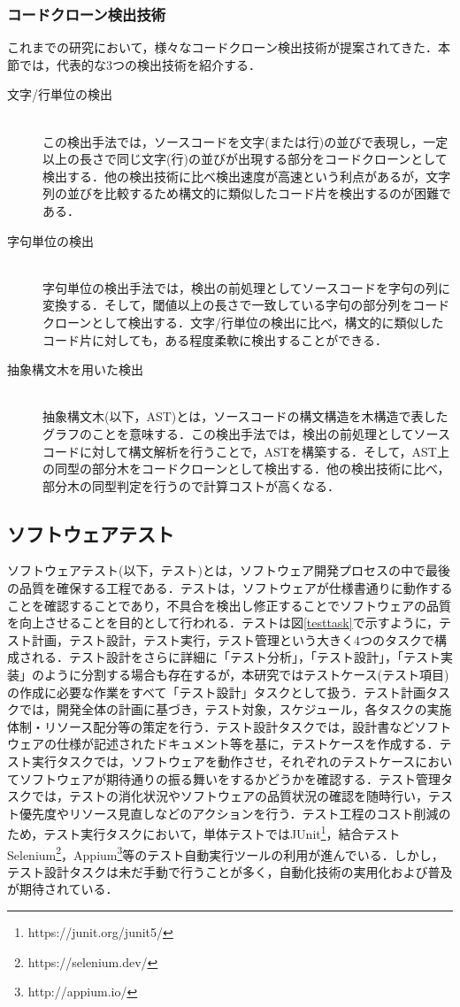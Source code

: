 \documentclass[12pt]{jarticle} %
\begin{document}
\subsubsection{コードクローン検出技術}
これまでの研究において，様々なコードクローン検出技術が提案されてきた\cite{c6,c1}．本節では，代表的な3つの検出技術を紹介する．

\begin{description}
\item[文字/行単位の検出]~\\
この検出手法では，ソースコードを文字(または行)の並びで表現し，一定以上の長さで同じ文字(行)の並びが出現する部分をコードクローンとして検出する．他の検出技術に比べ検出速度が高速という利点があるが，文字列の並びを比較するため構文的に類似したコード片を検出するのが困難である．
\item[字句単位の検出]~\\
字句単位の検出手法では，検出の前処理としてソースコードを字句の列に変換する．そして，閾値以上の長さで一致している字句の部分列をコードクローンとして検出する．文字/行単位の検出に比べ，構文的に類似したコード片に対しても，ある程度柔軟に検出することができる．
\item[抽象構文木を用いた検出]~\\
抽象構文木(以下，AST)とは，ソースコードの構文構造を木構造で表したグラフのことを意味する．この検出手法では，検出の前処理としてソースコードに対して構文解析を行うことで，ASTを構築する．そして，AST上の同型の部分木をコードクローンとして検出する．他の検出技術に比べ，部分木の同型判定を行うので計算コストが高くなる．
\end{description}

\subsection{ソフトウェアテスト}
ソフトウェアテスト(以下，テスト)とは，ソフトウェア開発プロセスの中で最後の品質を確保する工程である．テストは，ソフトウェアが仕様書通りに動作することを確認することであり，不具合を検出し修正することでソフトウェアの品質を向上させることを目的として行われる．テストは図\ref{testtask}で示すように，テスト計画，テスト設計，テスト実行，テスト管理という大きく4つのタスクで構成される．テスト設計をさらに詳細に「テスト分析」，「テスト設計」，「テスト実装」のように分割する場合も存在するが，本研究ではテストケース(テスト項目)の作成に必要な作業をすべて「テスト設計」タスクとして扱う．テスト計画タスクでは，開発全体の計画に基づき，テスト対象，スケジュール，各タスクの実施体制・リソース配分等の策定を行う．テスト設計タスクでは，設計書などソフトウェアの仕様が記述されたドキュメント等を基に，テストケースを作成する．テスト実行タスクでは，ソフトウェアを動作させ，それぞれのテストケースにおいてソフトウェアが期待通りの振る舞いをするかどうかを確認する．テスト管理タスクでは，テストの消化状況やソフトウェアの品質状況の確認を随時行い，テスト優先度やリソース見直しなどのアクションを行う．テスト工程のコスト削減のため，テスト実行タスクにおいて，単体テストではJUnit\footnote{https://junit.org/junit5/}，結合テストSelenium\footnote{https://selenium.dev/}，Appium\footnote{http://appium.io/}等のテスト自動実行ツールの利用が進んでいる．しかし，テスト設計タスクは未だ手動で行うことが多く，自動化技術の実用化および普及が期待されている．
\end{document}
